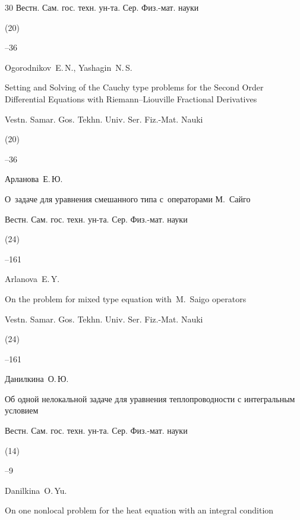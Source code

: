 \begin{thebibliography}{30}
\jour Вестн. Сам. гос. техн. ун-та. Сер. Физ.-мат. науки


(20)

--36

\misctransl

\by Ogorodnikov~E.\,N., Yashagin~N.\,S.

\paper Setting and Solving of the Cauchy type problems for the Second Order Differential Equations with Riemann--Liouville Fractional Derivatives

\jour Vestn. Samar. Gos. Tekhn. Univ. Ser. Fiz.-Mat. Nauki


(20)

--36






\by Арланова~Е.\,Ю.

\paper О~задаче для уравнения смешанного типа с~операторами М.~Сайго

\jour Вестн. Сам. гос. техн. ун-та. Сер. Физ.-мат. науки


(24)

--161

\misctransl

\by Arlanova~E.\,Y.

\paper On the problem for mixed type equation with~M.~Saigo operators

\jour Vestn. Samar. Gos. Tekhn. Univ. Ser. Fiz.-Mat. Nauki


(24)

--161




\by Данилкина~О.\,Ю.

\paper Об одной нелокальной задаче для уравнения теплопроводности с интегральным условием

\jour Вестн. Сам. гос. техн. ун-та. Сер. Физ.-мат. науки


(14)

--9

\misctransl

\by Danilkina~O.\,Yu.

\paper On one nonlocal problem for the heat equation with an integral condition


\end{thebibliography}
